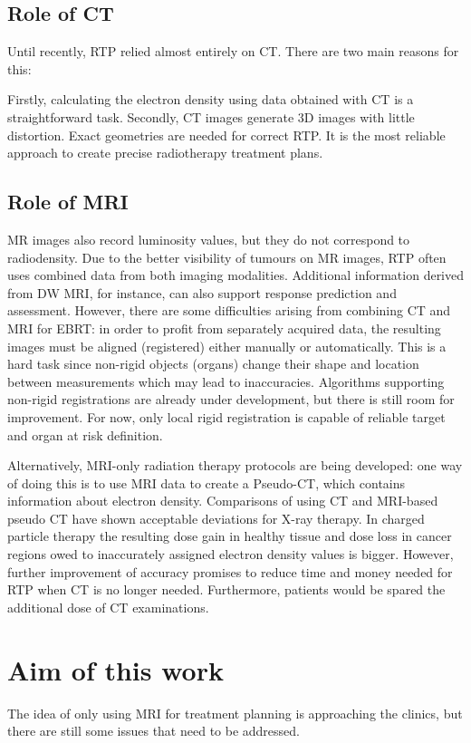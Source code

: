 \subsection{Role of CT}

Until recently, RTP relied almost entirely on CT.
There are two main reasons for this:

Firstly, calculating the electron density using data obtained with CT is a straightforward task.
Secondly, CT images generate 3D images with little distortion. Exact geometries are needed for correct RTP.
It is the most reliable approach to create precise radiotherapy treatment plans. \cite{Constantinou2012, Schneider1996}

\subsection{Role of MRI}
MR images also record luminosity values, but they do not correspond to radiodensity.
Due to the better visibility of tumours on MR images, RTP often uses combined data from both imaging modalities.
Additional information derived from DW MRI, for instance, can also support response prediction and assessment.
However, there are some difficulties arising from combining CT and MRI for EBRT:
in order to profit from separately acquired data, the resulting images must be aligned (registered) either manually or automatically.
This is a hard task since non-rigid objects (organs) change their shape and location between measurements which may lead to inaccuracies.
Algorithms supporting non-rigid registrations are already under development, but there is still room for improvement.
For now, only local rigid registration is capable of reliable target and organ at risk definition.

Alternatively, MRI-only radiation therapy protocols are being developed:
one way of doing this is to use MRI data to create a Pseudo-CT, which contains information about electron density.
Comparisons of using CT and MRI-based pseudo CT have shown acceptable deviations for X-ray therapy.
In charged particle therapy the resulting dose gain in healthy tissue and dose loss in cancer regions owed to inaccurately assigned electron density values is bigger.
However, further improvement of accuracy promises to reduce time and money needed for RTP when CT is no longer needed.
Furthermore, patients would be spared the additional dose of CT examinations.  \cite{Rank2013, Stanescu2006, Jonsson2010, Greer2015, Chen2004}


\section{Aim of this work}
The idea of only using MRI for treatment planning is approaching the clinics, but there are still some issues that need to be addressed.

